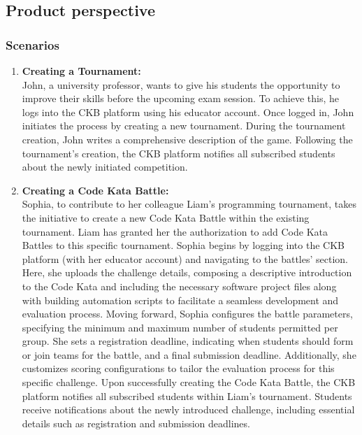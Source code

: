 \subsection{Product perspective}
\subsubsection{Scenarios}

\begin{enumerate}
   \item \textbf{Creating a Tournament:} \\
    John, a university professor, wants to give his students the opportunity to improve their skills before the upcoming exam session. To achieve this, he logs into the CKB platform using his educator account. Once logged in, John initiates the process by creating a new tournament.
    During the tournament creation, John writes a comprehensive description of the game. Following the tournament's creation, the CKB platform notifies all subscribed students about the newly initiated competition.
   

   \item \textbf{Creating a Code Kata Battle:} \\
Sophia, to contribute to her colleague Liam's programming tournament, takes the initiative to create a new Code Kata Battle within the existing tournament. Liam has granted her the authorization to add Code Kata Battles to this specific tournament.
Sophia begins by logging into the CKB platform (with her educator account) and navigating to the battles' section. Here, she uploads the challenge details, composing a descriptive introduction to the Code Kata and including the necessary software project files along with building automation scripts to facilitate a seamless development and evaluation process. Moving forward, Sophia configures the battle parameters, specifying the minimum and maximum number of students permitted per group. She sets a registration deadline, indicating when students should form or join teams for the battle, and a final submission deadline. Additionally, she customizes scoring configurations to tailor the evaluation process for this specific challenge.
Upon successfully creating the Code Kata Battle, the CKB platform notifies all subscribed students within Liam's tournament. Students receive notifications about the newly introduced challenge, including essential details such as registration and submission deadlines.
 

\end{enumerate}
